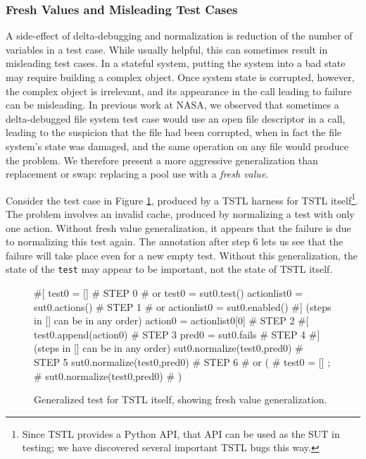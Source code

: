 \subsubsection{Fresh Values and Misleading Test Cases}
\label{freshgen}

A side-effect of delta-debugging and normalization is reduction of the
number of variables in a test case.  While usually helpful, this can
sometimes result in misleading test cases.  In a stateful system,
putting the system into a bad state may require building a complex
object.  Once system state is corrupted, however, the complex object
is irrelevant, and its appearance in the call leading to failure can
be misleading.  In previous work at NASA, we observed that sometimes a
delta-debugged file system test case \cite{ICSEDiff,AMAI} would use an
open file descriptor in a call, leading to the suspicion that the file
had been corrupted, when in fact the file system's state was damaged,
and the same operation on any file would produce the problem.  We
therefore present a more aggressive generalization than replacement or
swap: replacing a pool use with a \emph{fresh value}.

Consider the test case in Figure \ref{fig:mislead}, produced by a
TSTL harness for  TSTL itself\footnote{Since TSTL
  provides a Python API, that API can be used as the SUT in testing;
  we have discovered several important TSTL bugs this way.}.  The
problem involves an invalid cache, produced by normalizing a test with
only one action.  Without fresh value generalization, it appears that
the failure is due to normalizing this test again.
The annotation after step 6 lets us see that the failure
will take place even for a new empty test.
Without this generalization, the state of the {\tt test} may
appear to be important, not the state of  TSTL itself.

\begin{figure}
{\scriptsize
\begin{code}
\textcolor{black!60}{\#[}
test0 = []                             \textcolor{black!60}{\# STEP 0}
\textcolor{black!60}{\#  or test0 = sut0.test() }
actionlist0 = sut0.actions()           \textcolor{black!60}{\# STEP 1}
\textcolor{black!60}{\#  or actionlist0 = sut0.enabled() }
\textcolor{black!60}{\#] (steps in [] can be in any order)}
action0 = actionlist0[0]               \textcolor{black!60}{\# STEP 2}
\textcolor{black!60}{\#[}
test0.append(action0)                  \textcolor{black!60}{\# STEP 3}
pred0 = sut0.fails                     \textcolor{black!60}{\# STEP 4}
\textcolor{black!60}{\#] (steps in [] can be in any order)}
sut0.normalize(test0,pred0)            \textcolor{black!60}{\# STEP 5}
sut0.normalize(test0,pred0)            \textcolor{black!60}{\# STEP 6}
\textcolor{black!60}{\#  or (}
\textcolor{black!60}{\#      test0 = []  ;}
\textcolor{black!60}{\#      sut0.normalize(test0,pred0) }
\textcolor{black!60}{\#     )}
\end{code}
}
\caption{Generalized test for TSTL itself, showing fresh value
  generalization.}
\label{fig:mislead}
\end{figure}

